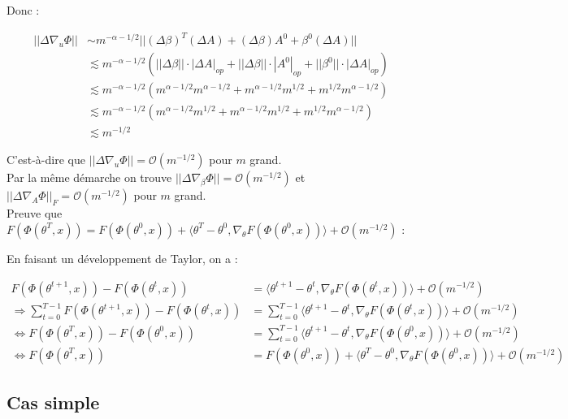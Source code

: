 \documentclass[a4paper, 11pt, french]{article}
\theoremstyle{definition}
\begin{document}
Donc :

\begin{align}
	||\Delta \nabla_u \Phi|| &\sim m^{-\alpha - 1/2} ||(\Delta \beta)^T(\Delta A) + (\Delta \beta) A^0 +  \beta^0 (\Delta A)|| \\
	&\lesssim m^{-\alpha - 1/2} (||\Delta \beta|| \cdot |\Delta A|_{op} + ||\Delta \beta|| \cdot |A^0|_{op} + ||\beta^0|| \cdot |\Delta A|_{op}) \\
	&\lesssim m^{-\alpha - 1/2} (m^{\alpha - 1/2}m^{\alpha - 1/2} + m^{\alpha - 1/2}m^{1/2} + m^{1/2}m^{\alpha - 1/2}) \\
	&\lesssim m^{-\alpha - 1/2} (m^{\alpha - 1/2}m^{1/2} + m^{\alpha - 1/2}m^{1/2} + m^{1/2}m^{\alpha - 1/2}) \\
	&\lesssim m^{-1/2}
\end{align}

C'est-à-dire que $||\Delta \nabla_u \Phi|| = \mathcal{O}(m^{-1/2})$ pour $m$ grand. \\

Par la même démarche on trouve $||\Delta \nabla_{\beta} \Phi|| = \mathcal{O}(m^{-1/2})$ et $||\Delta \nabla_{A} \Phi||_F = \mathcal{O}(m^{-1/2})$ pour $m$ grand. \\

Preuve que
$F(\Phi(\theta^{T}, x)) = F(\Phi(\theta^{0}, x)) + \langle \theta^{T}-\theta^0 , \nabla_{\theta} F(\Phi(\theta^0, x))  \rangle  + \mathcal{O}(m^{-1/2})$ :

En faisant un développement de Taylor, on a :

	\begin{align*}
	F(\Phi(\theta^{t+1}, x)) - F(\Phi(\theta^t, x))&= \langle \theta^{t+1}-\theta^t , \nabla_{\theta} F(\Phi(\theta^t, x))  \rangle  + \mathcal{O}(m^{-1/2}) \\
	\Longrightarrow \sum_{t=0}^{T-1} F(\Phi(\theta^{t+1}, x)) - F(\Phi(\theta^t, x)) &= \sum_{t=0}^{T-1} \langle \theta^{t+1}-\theta^t , \nabla_{\theta} F(\Phi(\theta^t, x))  \rangle  + \mathcal{O}(m^{-1/2}) \\
	\Longleftrightarrow F(\Phi(\theta^{T}, x)) - F(\Phi(\theta^{0}, x)) &= \sum_{t=0}^{T-1} \langle \theta^{t+1}-\theta^t , \nabla_{\theta} F(\Phi(\theta^0, x))  \rangle  + \mathcal{O}(m^{-1/2}) \\
	\Longleftrightarrow	F(\Phi(\theta^{T}, x)) &= F(\Phi(\theta^{0}, x)) + \langle \theta^{T}-\theta^0 , \nabla_{\theta} F(\Phi(\theta^0, x))  \rangle  + \mathcal{O}(m^{-1/2})
\end{align*}

\subsection{Cas simple}
\end{document}
